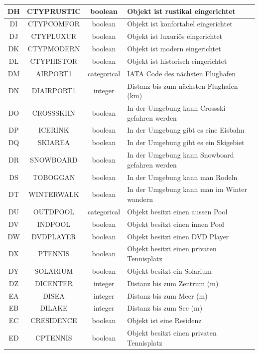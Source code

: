 \begin{longtable}{ | c | c | c | L{7.5cm} | }
	DH & CTYPRUSTIC & boolean & Objekt ist rustikal eingerichtet \\ \hline 
	DI & CTYPCOMFOR & boolean & Objekt ist konfortabel eingerichtet \\ \hline 
	DJ & CTYPLUXUR & boolean & Objekt ist luxuriös eingerichtet \\ \hline 
	DK & CTYPMODERN & boolean & Objekt ist modern eingerichtet \\ \hline 
	DL & CTYPHISTOR & boolean & Objekt ist historisch eingerichtet \\ \hline 
	DM & AIRPORT1 & categorical & IATA Code des nächsten Flughafen \\ \hline 
	DN & DIAIRPORT1 & integer & Distanz bis zum nächsten Flughafen (km) \\ \hline 
	DO & CROSSSKIIN & boolean & In der Umgebung kann Crossski gefahren werden \\ \hline 
	DP & ICERINK & boolean & In der Umgebung gibt es eine Eisbahn \\ \hline 
	DQ & SKIAREA & boolean & In der Umgebung gibt es ein Skigebiet \\ \hline 
	DR & SNOWBOARD & boolean & In der Umgebung kann Snowboard gefahren werden \\ \hline 
	DS & TOBOGGAN & boolean & In der Umgebung kann man Rodeln \\ \hline 
	DT & WINTERWALK & boolean & In der Umgebung kann man im Winter wandern \\ \hline 
	DU & OUTDPOOL & categorical & Objekt besitzt einen aussen Pool \\ \hline 
	DV & INDPOOL & boolean & Objekt besitzt einen innen Pool \\ \hline 
	DW & DVDPLAYER & boolean & Objekt besitzt einen DVD Player \\ \hline 
	DX & PTENNIS & boolean & Objekt besitzt einen privaten Tennisplatz \\ \hline 
	DY & SOLARIUM & boolean & Objekt besitzt ein Solarium \\ \hline 
	DZ & DICENTER & integer & Distanz bis zum Zentrum (m) \\ \hline 
	EA & DISEA & integer & Distanz bis zum Meer (m) \\ \hline 
	EB & DILAKE & integer & Distanz bis zum See (m) \\ \hline 
	EC & CRESIDENCE & boolean & Objekt ist eine Residenz \\ \hline 
	ED & CPTENNIS & boolean & Objekt besitzt einen privaten Tennisplatz \\ \hline 

\end{longtable}
